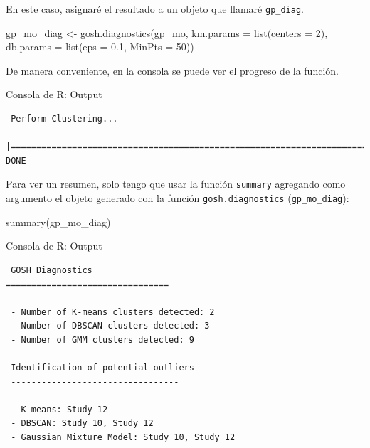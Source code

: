 \documentclass[
  bookmarksnumbered]{article}
\newenvironment{Shaded}{\begin{snugshade}}{\end{snugshade}}
\newcommand{\AttributeTok}[1]{\textcolor[rgb]{0.00,0.34,0.68}{#1}}
\newcommand{\DecValTok}[1]{\textcolor[rgb]{0.69,0.50,0.00}{#1}}
\newcommand{\FloatTok}[1]{\textcolor[rgb]{0.69,0.50,0.00}{#1}}
\newcommand{\FunctionTok}[1]{\textcolor[rgb]{0.39,0.29,0.61}{#1}}
\newcommand{\NormalTok}[1]{\textcolor[rgb]{0.12,0.11,0.11}{#1}}
\newcommand{\OtherTok}[1]{\textcolor[rgb]{0.00,0.43,0.16}{#1}}
\begin{document}
En este caso, asignaré el resultado a un objeto que llamaré \texttt{gp\_diag}.

\begin{Shaded}
\begin{Highlighting}[]
\NormalTok{gp\_mo\_diag }\OtherTok{\textless{}{-}} \FunctionTok{gosh.diagnostics}\NormalTok{(gp\_mo,}
                               \AttributeTok{km.params =} \FunctionTok{list}\NormalTok{(}\AttributeTok{centers =} \DecValTok{2}\NormalTok{),}
                               \AttributeTok{db.params =} \FunctionTok{list}\NormalTok{(}\AttributeTok{eps =} \FloatTok{0.1}\NormalTok{, }\AttributeTok{MinPts =} \DecValTok{50}\NormalTok{))}
\end{Highlighting}
\end{Shaded}

De manera conveniente, en la consola se puede ver el progreso de la función.

\begin{ROut}{Consola de R: Output~\thetcbcounter}
                \begin{footnotesize}
                \begin{verbatim}   
 Perform Clustering... 
 |==========================================================================================| DONE 
 \end{verbatim}
                \end{footnotesize}
                \end{ROut}

Para ver un resumen, solo tengo que usar la función \texttt{summary} agregando como argumento el objeto generado con la función \texttt{gosh.diagnostics} (\texttt{gp\_mo\_diag}):

\begin{Shaded}
\begin{Highlighting}[]
\FunctionTok{summary}\NormalTok{(gp\_mo\_diag)}
\end{Highlighting}
\end{Shaded}

\begin{ROut}{Consola de R: Output~\thetcbcounter}
                \begin{footnotesize}
                \begin{verbatim} GOSH Diagnostics 
================================ 

 - Number of K-means clusters detected: 2
 - Number of DBSCAN clusters detected: 3
 - Number of GMM clusters detected: 9

 Identification of potential outliers 
 --------------------------------- 

 - K-means: Study 12
 - DBSCAN: Study 10, Study 12
 - Gaussian Mixture Model: Study 10, Study 12
 \end{verbatim}
                \end{footnotesize}
                \end{ROut}
\end{document}
